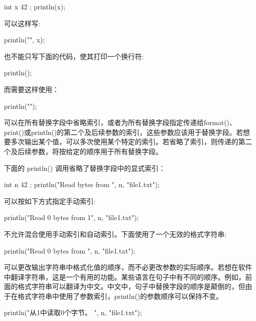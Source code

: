 \begin{cpp}
int x { 42 };
println(x);
\end{cpp}

可以这样写:

\begin{cpp}
println("{}", x);
\end{cpp}

也不能只写下面的代码，使其打印一个换行符:

\begin{cpp}
println();
\end{cpp}

而需要这样使用：

\begin{cpp}
println("");
\end{cpp}


可以在所有替换字段中省略索引，或者为所有替换字段指定传递给format()、print()或println()的第二个及后续参数的索引，这些参数应该用于替换字段。若想要多次输出某个值，可以多次使用某个特定的索引。若省略了索引，则传递的第二个及后续参数，将按给定的顺序用于所有替换字段。

下面的 println() 调用省略了替换字段中的显式索引：

\begin{cpp}
int n { 42 };
println("Read {} bytes from {}", n, "file1.txt");
\end{cpp}

可以按如下方式指定手动索引:

\begin{cpp}
println("Read {0} bytes from {1}", n, "file1.txt");
\end{cpp}

不允许混合使用手动索引和自动索引。下面使用了一个无效的格式字符串:

\begin{cpp}
println("Read {0} bytes from {}", n, "file1.txt");
\end{cpp}

可以更改输出字符串中格式化值的顺序，而不必更改参数的实际顺序。若想在软件中翻译字符串，这是一个有用的功能。某些语言在句子中有不同的顺序。例如，前面的格式字符串可以翻译为中文。中文中，句子中替换字段的顺序是颠倒的，但由于在格式字符串中使用了参数索引，println()的参数顺序可以保持不变。

\begin{cpp}
println("从{1}中读取{0}个字节。 ", n, "file1.txt");
\end{cpp}


